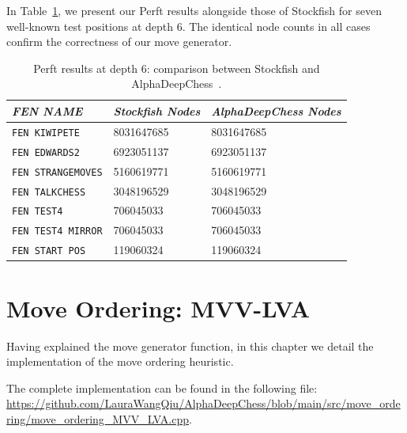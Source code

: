 \vspace{1em}

\noindent In Table~\ref{tab:perftResults}, we present our Perft results alongside those of Stockfish for seven well-known test positions at depth 6. The identical node counts in all cases confirm the correctness of our move generator.

\vspace{1em}

\begin{table}[H]
    \centering
    \begin{tabular}{|l|l|l}
    \hline
    \textit{FEN NAME} & \textit{Stockfish Nodes} & \textit{AlphaDeepChess Nodes} \\
    \hline
    \texttt{FEN KIWIPETE}       &  8031647685 &  8031647685   \\
    \texttt{FEN EDWARDS2}       &  6923051137 &  6923051137   \\
    \texttt{FEN STRANGEMOVES}   &  5160619771 &  5160619771   \\
    \texttt{FEN TALKCHESS}      &  3048196529 &  3048196529   \\
    \texttt{FEN TEST4}          &  706045033  &  706045033    \\
    \texttt{FEN TEST4 MIRROR}   &  706045033  &  706045033    \\
    \texttt{FEN START POS}      &  119060324  &  119060324    \\
    \hline
    \end{tabular}
    \caption{Perft results at depth 6: comparison between Stockfish and AlphaDeepChess~\cite{PerftResults}.}
    \label{tab:perftResults}
\end{table}

\newpage
\section{Move Ordering: MVV-LVA}
 
\noindent Having explained the move generator function, in this chapter we detail the implementation of the move ordering heuristic.

\vspace{1em}

\noindent The complete implementation can be found in the following file:\\
\scriptsize\url{https://github.com/LauraWangQiu/AlphaDeepChess/blob/main/src/move_ordering/move_ordering_MVV_LVA.cpp}\normalsize.

\vspace{1em}

